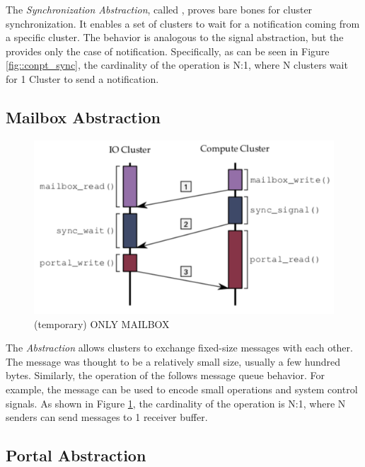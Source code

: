 			The \textit{Synchronization Abstraction}, called \sync, proves bare bones
			for cluster synchronization.
			It enables a set of clusters to wait for a notification coming from a
			specific cluster.
			The behavior is analogous to the \posix signal abstraction, but the \sync
			provides only the case of notification.
			Specifically, as can be seen in Figure \ref{fig::conpt_sync}, the
			cardinality of the operation is N:1, where N clusters wait for 1 Cluster
			to send a notification.

		\subsection{Mailbox Abstraction}
		\label{sec::mailbox_abs}

			\begin{figure}[h]
				\centering
				\includegraphics[width=.7\textwidth]{images/conceptual-sync.png}

				\caption{
					(temporary) ONLY MAILBOX
				}\par
				\label{fig::conpt_mailbox}
			\end{figure}

			The \textit{\mailbox Abstraction} allows clusters to exchange fixed-size
			messages with each other.
			The message was thought to be a relatively small size, usually a few hundred bytes.
			Similarly, the operation of the \mailbox follows \posix message queue behavior.
			For example, the message can be used to encode small operations and system
			control signals.
			As shown in Figure \ref{fig::conpt_mailbox}, the cardinality of the operation
			is N:1, where N senders can send messages to 1 receiver buffer.

		\subsection{Portal Abstraction}
		\label{sec::portal_abs}


